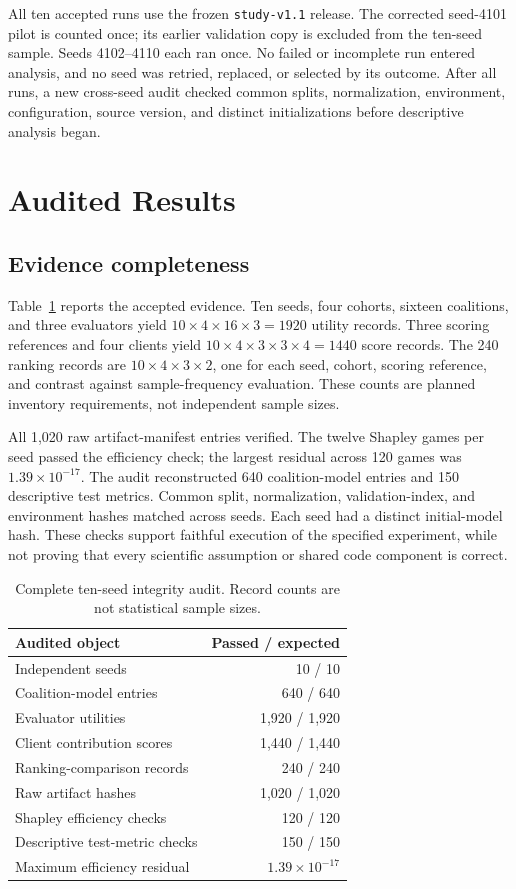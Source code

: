 \documentclass[conference,letterpaper]{IEEEtran}
\begin{document}
All ten accepted runs use the frozen \texttt{study-v1.1} release. The corrected seed-4101 pilot is counted once; its earlier validation copy is excluded from the ten-seed sample. Seeds 4102--4110 each ran once. No failed or incomplete run entered analysis, and no seed was retried, replaced, or selected by its outcome. After all runs, a new cross-seed audit checked common splits, normalization, environment, configuration, source version, and distinct initializations before descriptive analysis began.

\section{Audited Results}
\subsection{Evidence completeness}
Table~\ref{tab:audit} reports the accepted evidence. Ten seeds, four cohorts, sixteen coalitions, and three evaluators yield $10\times4\times16\times3=1920$ utility records. Three scoring references and four clients yield $10\times4\times3\times3\times4=1440$ score records. The 240 ranking records are $10\times4\times3\times2$, one for each seed, cohort, scoring reference, and contrast against sample-frequency evaluation. These counts are planned inventory requirements, not independent sample sizes.

All 1,020 raw artifact-manifest entries verified. The twelve Shapley games per seed passed the efficiency check; the largest residual across 120 games was $1.39\times10^{-17}$. The audit reconstructed 640 coalition-model entries and 150 descriptive test metrics. Common split, normalization, validation-index, and environment hashes matched across seeds. Each seed had a distinct initial-model hash. These checks support faithful execution of the specified experiment, while not proving that every scientific assumption or shared code component is correct.

\begin{table}[t]
\caption{Complete ten-seed integrity audit. Record counts are not statistical sample sizes.}
\label{tab:audit}\centering\small
\begin{tabular}{lr}\toprule
Audited object & Passed / expected\\\midrule
Independent seeds & 10 / 10\\
Coalition-model entries & 640 / 640\\
Evaluator utilities & 1,920 / 1,920\\
Client contribution scores & 1,440 / 1,440\\
Ranking-comparison records & 240 / 240\\
Raw artifact hashes & 1,020 / 1,020\\
Shapley efficiency checks & 120 / 120\\
Descriptive test-metric checks & 150 / 150\\\midrule
Maximum efficiency residual & $1.39\times10^{-17}$\\\bottomrule
\end{tabular}
\end{table}
\end{document}
